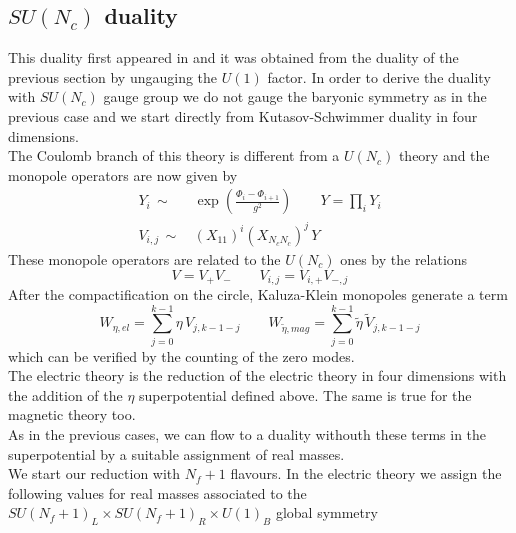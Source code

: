 \subsection{ $SU(N_c)$ duality }
This duality first appeared in \cite{Park:2013wta} and it was obtained from the duality of the previous section by ungauging the $U(1)$ factor.
In order to derive the duality with $SU(N_c)$ gauge group we do not gauge the baryonic symmetry as in the previous case and we start directly from Kutasov-Schwimmer duality in four dimensions.
\\
The Coulomb branch of this theory is different from a $U(N_c)$ theory and the monopole operators are now given by \cite{Nii:2014jsa}
\begin{align}
Y_i \, \sim \, & \exp \left(   \frac{ \Phi_i - \Phi_{i+1}}{g^2}  \right) \qquad 
Y = \prod_i Y_i
\\
V_{i,j} \, \sim \, & (X_{11})^i (X_{N_c N_c})^j\, Y
\end{align}
These monopole operators are related to the $U(N_c)$ ones by the relations
\begin{equation}
 V = V_+ V_- \qquad V_{i,j} = V_{i,+} V_{-,j}
 \end{equation} 
After the compactification on the circle, Kaluza-Klein monopoles generate a term \cite{Nii:2014jsa}
\begin{equation}
W_{\eta, el} = \sum_{j=0}^{k-1} \eta \, V_{j,k-1-j} \qquad W_{\tilde{\eta}, mag} = \sum_{j=0}^{k-1 } \tilde{\eta} \, \tilde{V}_{j,k-1-j} 
\end{equation}  
which can be verified by the counting of the zero modes.\\
The electric theory is the reduction of the electric theory in four dimensions with the addition of the $\eta$ superpotential defined above.
The same is true for the magnetic theory too.\\
As in the previous cases, we can flow to a duality withouth these terms in the superpotential by a suitable assignment of real masses.\\ 
We start our reduction with $N_f+1$ flavours.
In the electric theory we assign the following values for real masses associated to the $SU(N_f+1)_L \times SU(N_f+1)_R \times U(1)_B$ global symmetry
